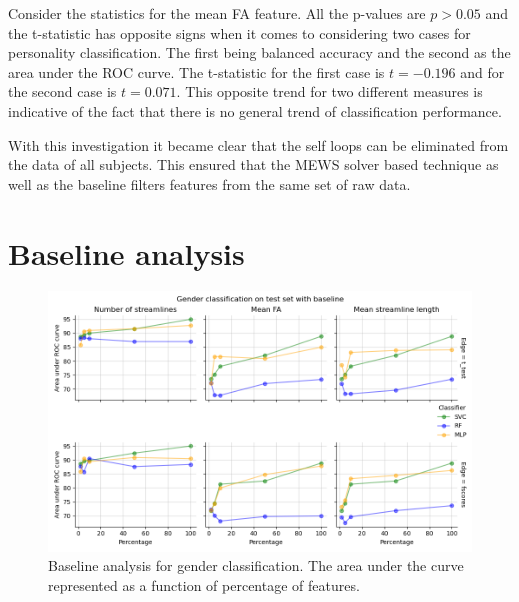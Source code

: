\documentclass[msthesis.tex]{subfiles}
\begin{document}
Consider the statistics for the mean FA feature. All the p-values are $p>0.05$ and the t-statistic has opposite signs when it comes to considering two cases for personality classification. The first being balanced accuracy and the second as the area under the ROC curve. The t-statistic for the first case is $t=-0.196$ and for the second case is $t=0.071$. This opposite trend for two different  measures is indicative of the fact that there is no general trend of classification performance. 

With this investigation it became clear that the self loops can be eliminated from the data of all subjects. This ensured that the MEWS solver based technique as well as the baseline filters features from the same set of raw data.

\section{Baseline analysis}
\begin{figure}
    \centering
    \includegraphics[width=\textwidth]{images/baseline_results_gender.png}
    \caption{Baseline analysis for gender classification. The area under the curve represented as a function of percentage of features. }
    \label{fig:baselinegender}
\end{figure}
\end{document}
